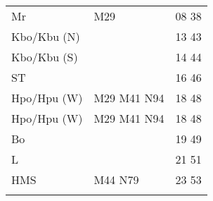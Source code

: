 \begin{tabular}{!{\color{schiefergrau}\vrule width 3pt}*{3}{l!{\color{schiefergrau}\vrule width 3pt}}}
Mr           & \mbus{} M29                                                & 08 38 \\
Kbo/Kbu (N)  & \nueins{}                                                  & 13 43 \\
Kbo/Kbu (S)  & \nueins{}                                                  & 14 44 \\
ST           &                                                            & 16 46 \\
Hpo/Hpu (W)  & \nusieben{} \mbus{} M29 M41 \nbus{} N94                    & 18 48 \\
\hline
Hpo/Hpu (W)  & \nusieben{} \mbus{} M29 M41 \nbus{} N94                    & 18 48 \\
Bo           &                                                            & 19 49 \\
L            &                                                            & 21 51 \\
HMS          & \mbus{} M44 \nbus{} N79                                    & 23 53 \\
\myhline
\end{tabular}
%
